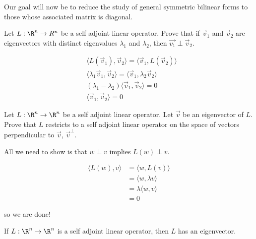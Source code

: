 Our goal will now be to reduce the study of general symmetric bilinear forms to those whose associated matrix is diagonal.

	Let $L: \R^n \to R^n$ be a self adjoint linear operator.  Prove that if $\vec{v}_1$ and $\vec{v}_2$ are eigenvectors with 
	distinct eigenvalues $\lambda_1$  and $\lambda_2$, then $\vec{v_1} \perp \vec{v}_2$.
\begin{free-response}
	\begin{align*}
		&\langle  L(\vec{v}_1), \vec{v}_2 \rangle = \langle \vec{v}_1  ,L(\vec{v}_2)\rangle\\
		&\langle \lambda_1\vec{v}_1, \vec{v}_2\rangle = \langle  \vec{v}_1,\lambda_2 \vec{v}_2\rangle\\
		& (\lambda_1 - \lambda_2)\langle \vec{v}_1,\vec{v}_2\rangle =0\\
		&\langle \vec{v}_1,\vec{v}_2\rangle = 0
	\end{align*}
\end{free-response}

	Let $L:\R^n \to \R^n$ be a self adjoint linear operator.  Let $\vec{v}$ be an eigenvector of $L$.  Prove that $L$ restricts to a self adjoint linear operator
	on the space of vectors perpendicular to $\vec{v}$,  $\vec{v}^\perp$.  

\begin{free-response}
	All we need to show is that $w \perp v$ implies $L(w) \perp v$.
	
	\begin{align*}
		\langle  L(w), v \rangle &= \langle w, L(v)\rangle\\
			&= \langle  w, \lambda v\rangle\\
			&=\lambda \langle w, v \rangle\\
			&=0
	\end{align*}
	
	so we are done!
\end{free-response}

\begin{theorem}
	If $L: \R^n \to \R^n$ is a self adjoint linear operator, then $L$ has an eigenvector.
\end{theorem}

